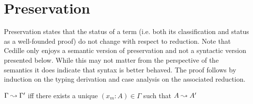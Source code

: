 \section{Preservation}

Preservation states that the status of a term (i.e. both its classification and status as a well-founded proof) do not change with respect to reduction.
Note that Cedille only enjoys a semantic version of preservation and not a syntactic version presented below.
While this may not matter from the perspective of the semantics it does indicate that syntax is better behaved.
The proof follows by induction on the typing derivation and case analysis on the associated reduction.

\begin{definition}
    $\Gamma \leadsto \Gamma^\prime$ iff there exists a unique $(x_m : A) \in \Gamma$ such that $A \leadsto A^\prime$
\end{definition}

